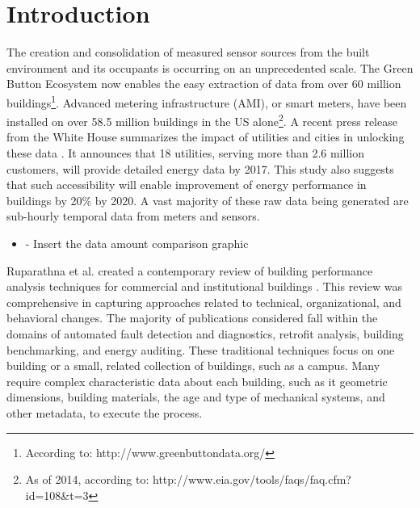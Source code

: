 \section{Introduction}
\label{sec:intro}

The creation and consolidation of measured sensor sources from the built environment and its occupants is occurring on an unprecedented scale. The Green Button Ecosystem now enables the easy extraction of data from over 60 million buildings\footnote{According to: http://www.greenbuttondata.org/}. Advanced metering infrastructure (AMI), or smart meters, have been installed on over 58.5 million buildings in the US alone\footnote{As of 2014, according to: http://www.eia.gov/tools/faqs/faq.cfm?id=108&t=3}. A recent press release from the White House summarizes the impact of utilities and cities in unlocking these data \cite{the_white_house_fact_2016}. It announces that 18 utilities, serving more than 2.6 million customers, will provide detailed energy data by 2017. This study also suggests that such accessibility will enable improvement of energy performance in buildings by 20\% by 2020. A vast majority of these raw data being generated are sub-hourly temporal data from meters and sensors. 

\begin{itemize}
\item - Insert the data amount comparison graphic
\end{itemize}

Ruparathna et al. created a contemporary review of building performance analysis techniques for commercial and institutional buildings \cite{ruparathna_improving_2016}. This review was comprehensive in capturing approaches related to technical, organizational, and behavioral changes. The majority of publications considered fall within the domains of automated fault detection and diagnostics, retrofit analysis, building benchmarking, and energy auditing. These traditional techniques focus on one building or a small, related collection of buildings, such as a campus. Many require complex characteristic data about each building, such as it geometric dimensions, building materials, the age and type of mechanical systems, and other metadata, to execute the process. 

